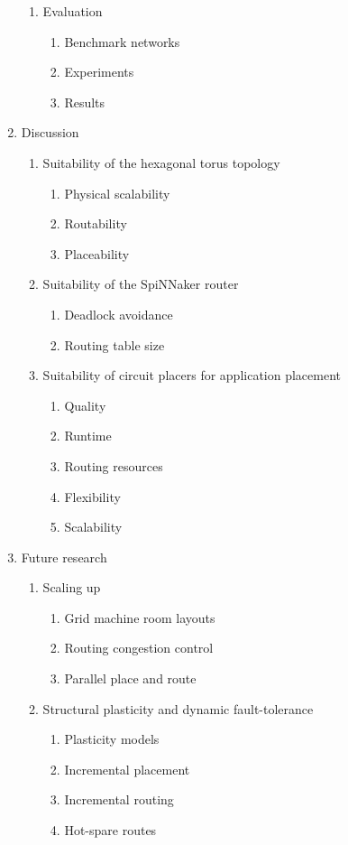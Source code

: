 \begin{enumerate}
\begin{enumerate}
		\item Evaluation
		\begin{enumerate}
			\item Benchmark networks
			\item Experiments
			\item Results
		\end{enumerate}
	\end{enumerate}
	
	\item Discussion
	\begin{enumerate}
		\item Suitability of the hexagonal torus topology
		\begin{enumerate}
			\item Physical scalability
			\item Routability
			\item Placeability
		\end{enumerate}
		
		\item Suitability of the SpiNNaker router
		\begin{enumerate}
			\item Deadlock avoidance
			\item Routing table size
		\end{enumerate}
		
		\item Suitability of circuit placers for application placement
		\begin{enumerate}
			\item Quality
			\item Runtime
			\item Routing resources
			\item Flexibility
			\item Scalability
		\end{enumerate}
	\end{enumerate}
	
	\item Future research
	\begin{enumerate}
		\item Scaling up
		\begin{enumerate}
			\item Grid machine room layouts
			\item Routing congestion control
			\item Parallel place and route
		\end{enumerate}
		
		\item Structural plasticity and dynamic fault-tolerance
		\begin{enumerate}
			\item Plasticity models
			\item Incremental placement
			\item Incremental routing
			\item Hot-spare routes
		\end{enumerate}
		

\end{enumerate}
\end{enumerate}
